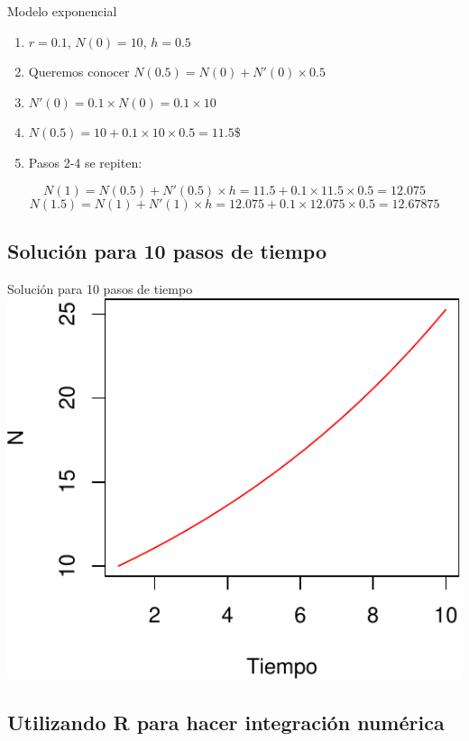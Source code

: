 \documentclass[
  11pt,
  ignorenonframetext,
]{beamer}
\begin{document}
\begin{frame}{Modelo exponencial}
\begin{enumerate}
\item
  \(r = 0.1\), \(N(0) = 10\), \(h = 0.5\)
\item
  Queremos conocer \(N(0.5) = N(0) + N'(0) \times 0.5\)
\item
  \(N'(0) = 0.1 \times N(0) = 0.1 \times 10\)
\item
  \(N(0.5) = 10 + 0.1 \times 10 \times 0.5 = 11.5\)\$
\item
  Pasos 2-4 se repiten:
\end{enumerate}

\[N(1) = N(0.5) + N'(0.5) \times h = 11.5 + 0.1\times 11.5 \times 0.5 = 12.075\]
\[N(1.5) = N(1) + N'(1) \times h = 12.075 + 0.1\times 12.075 \times 0.5 = 12.67875\]
\end{frame}

\hypertarget{soluciuxf3n-para-10-pasos-de-tiempo}{%
\subsection{Solución para 10 pasos de
tiempo}\label{soluciuxf3n-para-10-pasos-de-tiempo}}

\begin{frame}{Solución para 10 pasos de tiempo}
\includegraphics{Modelos-meta_files/figure-beamer/unnamed-chunk-1-1.pdf}
\end{frame}

\hypertarget{utilizando-r-para-hacer-integraciuxf3n-numuxe9rica}{%
\subsection{Utilizando R para hacer integración
numérica}\label{utilizando-r-para-hacer-integraciuxf3n-numuxe9rica}}
\end{document}

